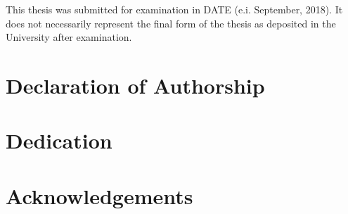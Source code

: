 \documentclass[11pt]{report}
\begin{document}


\newpage
	\begin{center}
	\thispagestyle{empty}
	\vspace*{\fill}
	This thesis was submitted for examination in DATE (e.i. September, 2018). It does not necessarily represent the final form of the thesis as deposited in the University after examination.
	\vspace*{\fill}
	\end{center}
\newpage



\chapter*{Declaration of Authorship}


\chapter*{Dedication}


\chapter*{Acknowledgements}

\newpage


{}
\tableofcontents
\newpage

{} 
\listoffigures
\newpage

{} 
\listoftables
\newpage

{} 
\end{document}
